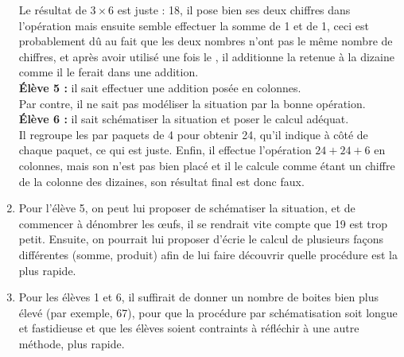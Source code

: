 \begin{corrige}
\begin{enumerate}
   Le résultat de $3\times6$ est juste : 18, il pose bien ses deux chiffres dans l'opération mais ensuite semble effectuer la somme de 1 et de 1, ceci est probablement dû au fait que les deux nombres n'ont pas le même nombre de chiffres, et après avoir utilisé une fois le  \fg{}, il additionne la retenue à la dizaine comme il le ferait dans une addition. \\
   {\bf Élève 5 : } il sait effectuer une addition posée en colonnes. \\
   Par contre, il ne sait pas modéliser la situation par la bonne opération. \\
   {\bf Élève 6 : } il sait schématiser la situation et poser le calcul adéquat. \\
   Il regroupe les  \fg{} par paquets de 4 pour obtenir 24, qu'il indique à côté de chaque paquet, ce qui est juste. Enfin, il effectue l'opération $24+24+6$ en colonnes, mais son  \fg{} n'est pas bien placé et il le calcule comme étant un chiffre de la colonne des dizaines, son résultat final est donc faux.
   \item Pour l’élève 5, on peut lui proposer de schématiser la situation, et de commencer à dénombrer les \oe ufs, il se rendrait vite compte que 19 est trop petit. Ensuite, on pourrait lui proposer d'écrie le calcul de plusieurs façons différentes (somme, produit) afin de lui faire découvrir quelle procédure est la plus rapide.
   \item Pour les élèves 1 et 6, il suffirait de donner un nombre de boites bien plus élevé (par exemple, 67), pour que la procédure par schématisation soit longue et fastidieuse et que les élèves soient contraints à réfléchir à une autre méthode, plus rapide.
\end{enumerate}
\end{corrige}

\bigskip


